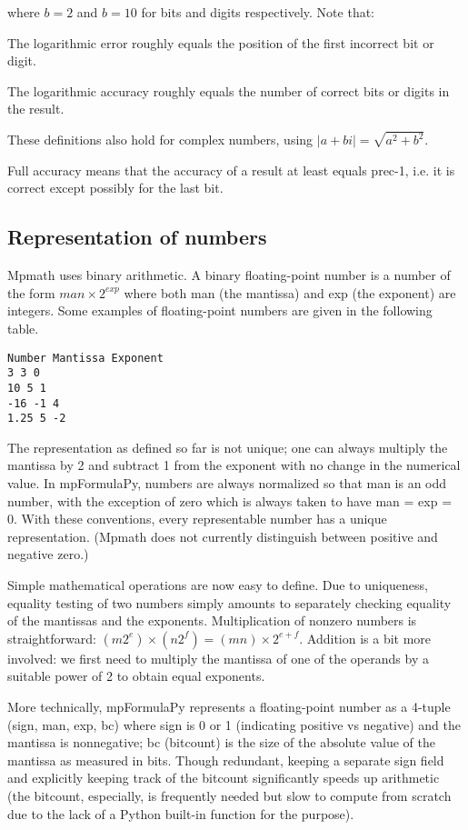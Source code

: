 \vpara
where $b=2$ and $b=10$ for bits and digits respectively. Note that:

\vpara
The logarithmic error roughly equals the position of the first incorrect bit or digit.

The logarithmic accuracy roughly equals the number of correct bits or digits in the result.

\vpara
These definitions also hold for complex numbers, using $|a+bi|=\sqrt{a^2+b^2}$.

Full accuracy means that the accuracy of a result at least equals prec-1, i.e. it is correct except possibly for the last bit.




\subsection{Representation of numbers}

Mpmath uses binary arithmetic. A binary floating-point number is a number of the form $man \times 2^{exp}$ where both man (the mantissa) and exp (the exponent) are integers. Some examples of floating-point numbers are given in the following table.

\vpara
\begin{verbatim}
Number Mantissa Exponent
3 3 0
10 5 1
-16 -1 4
1.25 5 -2
\end{verbatim}


\vpara
The representation as defined so far is not unique; one can always multiply the mantissa by 2 and subtract 1 from the exponent with no change in the numerical value. In mpFormulaPy, numbers are always normalized so that man is an odd number, with the exception of zero
which is always taken to have man = exp = 0. With these conventions, every representable number has a unique representation. (Mpmath does not currently distinguish between positive and negative zero.)

\vpara
Simple mathematical operations are now easy to define. Due to uniqueness, equality testing of two numbers simply amounts to separately checking equality of the mantissas and the exponents. Multiplication of nonzero numbers is straightforward: $(m2^e) \times (n2^f) = (mn) \times 2^{e+f}$. Addition is a bit more involved: we first need to multiply the mantissa of one of the operands by a suitable power of 2 to obtain equal exponents.

\vpara
More technically, mpFormulaPy represents a floating-point number as a 4-tuple (sign, man, exp, bc) where sign is 0 or 1 (indicating positive vs negative) and the mantissa is nonnegative; bc (bitcount) is the size of the absolute value of the mantissa as measured in bits. Though
redundant, keeping a separate sign field and explicitly keeping track of the bitcount significantly speeds up arithmetic (the bitcount, especially, is frequently needed but slow to compute from scratch due to the lack of a Python built-in function for the purpose).

